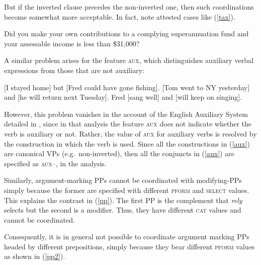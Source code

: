 {\noindent
But if the inverted clause precedes the non-inverted one, then such coordinations become somewhat more acceptable. In fact,  \citet[1332--1333]{rodney} note attested cases like 
(\ref{tax}).

\begin{exe}
\ex Did you make your own contributions to a complying superannuation fund and
your assessable income is less than \$31,000?\label{tax}
\end{exe}

\noindent
A similar problem arises for the feature \textsc{aux}, which distinguishes auxiliary verbal expressions from those that
are not auxiliary:

\eal
\label{aux}
\ex {}[I stayed home]\sub{\aux $-$} but [Fred could have gone fishing]\sub{\aux $+$}.
\ex {}[Tom went to NY yesterday]\sub{\aux $-$} and [he will return next Tuesday]\sub{\aux $+$}.
\ex Fred [sang well]\sub{\aux $-$} and [will keep on singing]\sub{\aux $+$}.
\zl

\noindent
However, this problem vanishes in the account of the English Auxiliary System detailed in \citet{SagEtAl20}, since in that analysis
the feature \textsc{aux} does not indicate whether the verb is auxiliary or not. Rather, the value of \textsc{aux} for auxiliary verbs is resolved by the construction in which the verb is used. Since all the constructions in (\ref{aux}) are canonical VPs (e.g.\ non-inverted), then 
all the conjuncts in (\ref{aux}) are specified as \textsc{aux--}, in
the \citet{SagEtAl20} analysis.




Similarly, argument-marking PPs cannot be coordinated with modifying-PPs simply because the former are specified with different  \textsc{pform} and \textsc{select} values. This explains the contrast
in (\ref{pp}). The first PP is the complement that \emph{rely}
selects but the second is a modifier. Thus, they have different \textsc{cat} values 
and cannot be coordinated.


\eal
\label{pp}
\zl

\noindent
Consequently, it is in general not possible to coordinate argument marking PPs headed by different prepositions, simply because they bear
different \textsc{pform} values as shown in (\ref{pp2}).

\eal
\label{pp2}

}
